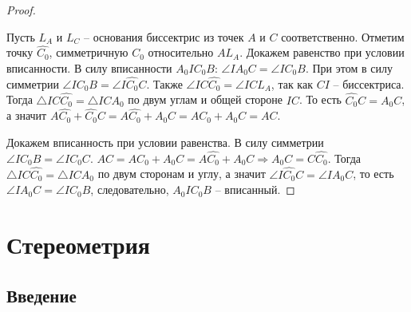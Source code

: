 \documentclass[12pt]{article}
\theoremstyle{definition}
\begin{document}
\begin{proof}
\begin{center}
        \end{center}
        Пусть $L_A$ и $L_C$ -- основания биссектрис из точек $A$ и $C$ соответственно. Отметим точку $\widehat{C_0}$, симметричную $C_0$ относительно $AL_A$. Докажем равенство при условии вписанности. В силу вписанности $A_0IC_0B$: $\angle IA_0C=\angle IC_0B$. При этом в силу симметрии $\angle IC_0B=\angle I\widehat{C_0}C$. Также $\angle IC\widehat{C_0}=\angle ICL_A$, так как $CI$ -- биссектриса. Тогда $\triangle IC\widehat{C_0} = \triangle ICA_0$ по двум углам и общей стороне $IC$. То есть $\widehat{C_0}C=A_0C$, а значит $A\widehat{C_0} + \widehat{C_0}C=A\widehat{C_0}+A_0C=AC_0+A_0C=AC$.\bigskip

        Докажем вписанность при условии равенства. В силу симметрии $\angle IC_0B=\angle I\widehat{C_0}C$. $AC=AC_0+A_0C=A\widehat{C_0}+A_0C\Longrightarrow A_0C=C\widehat{C_0}$. Тогда $\triangle IC\widehat{C_0} = \triangle ICA_0$ по двум сторонам и углу, а значит $\angle I\widehat{C_0}C=\angle IA_0C$, то есть $\angle IA_0C=\angle IC_0B$, следовательно, $A_0IC_0B$ -- вписанный.
    \end{proof}

    \section{Стереометрия}

    \subsection{Введение}
    
\end{document}
